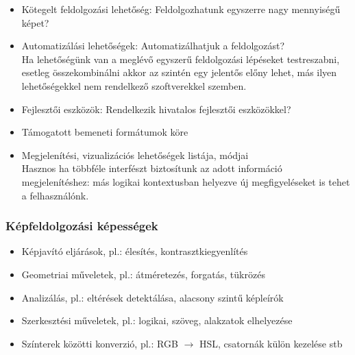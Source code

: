 \documentclass[a4paper,12pt,oneside]{report}
\begin{document}
\begin{itemize}
	\item Kötegelt feldolgozási lehetőség: Feldolgozhatunk egyszerre nagy mennyiségű képet?
	\item Automatizálási lehetőségek: Automatizálhatjuk a feldolgozást?\\Ha lehetőségünk van a meglévő egyszerű feldolgozási lépéseket testreszabni, esetleg összekombinálni akkor az szintén egy jelentős előny lehet, más ilyen lehetőségekkel nem rendelkező szoftverekkel szemben.
	\item Fejlesztői eszközök: Rendelkezik hivatalos fejlesztői eszközökkel?
	\item Támogatott bemeneti formátumok köre
	\item Megjelenítési, vizualizációs lehetőségek listája, módjai\\Hasznos ha többféle interfészt biztosítunk az adott információ megjelenítéshez: más logikai kontextusban helyezve új megfigyeléseket is tehet a felhasználónk.

\end{itemize}


\subsubsection{Képfeldolgozási képességek}
\begin{itemize}
	\itemsep0em
	\item Képjavító eljárások, pl.: élesítés, kontrasztkiegyenlítés
	\item Geometriai műveletek, pl.: átméretezés, forgatás, tükrözés
	\item Analizálás, pl.: eltérések detektálása, alacsony szintű képleírók
	\item Szerkesztési műveletek, pl.: logikai, szöveg, alakzatok elhelyezése
	\item Színterek közötti konverzió, pl.: RGB $\rightarrow $ HSL, csatornák külön kezelése stb

\end{itemize}
\end{document}
